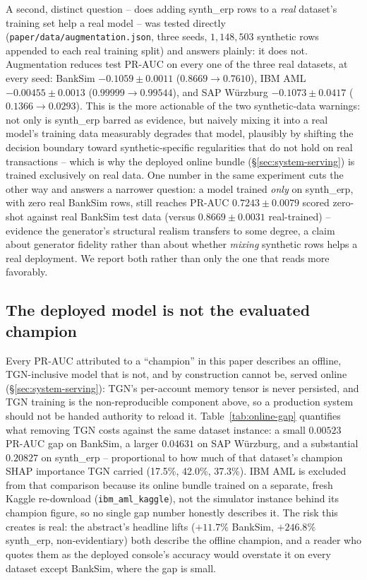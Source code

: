 A second, distinct question -- does adding synth\_erp rows to a \emph{real}
dataset's training set help a real model -- was tested directly
(\texttt{paper/data/augmentation.json}, three seeds, $1{,}148{,}503$ synthetic
rows appended to each real training split) and answers plainly: it does not.
Augmentation reduces test PR-AUC on every one of the three real datasets, at
every seed: BankSim $-0.1059\pm0.0011$ ($0.8669\to0.7610$), IBM AML
$-0.00455\pm0.0013$ ($0.99999\to0.99544$), and SAP W\"urzburg
$-0.1073\pm0.0417$ ($0.1366\to0.0293$). This is the more actionable of the
two synthetic-data warnings: not only is synth\_erp barred as evidence, but
naively mixing it into a real model's training data measurably degrades that
model, plausibly by shifting the decision boundary toward synthetic-specific
regularities that do not hold on real transactions -- which is why the
deployed online bundle (\S\ref{sec:system-serving}) is trained exclusively
on real data. One number in the same experiment cuts the other way and
answers a narrower question: a model trained \emph{only} on synth\_erp, with
zero real BankSim rows, still reaches PR-AUC $0.7243\pm0.0079$ scored
zero-shot against real BankSim test data (versus $0.8669\pm0.0031$
real-trained) -- evidence the generator's structural realism transfers to
some degree, a claim about generator fidelity rather than about whether
\emph{mixing} synthetic rows helps a real deployment. We report both rather
than only the one that reads more favorably.

\subsection{The deployed model is not the evaluated champion}
Every PR-AUC attributed to a ``champion'' in this paper describes an
offline, TGN-inclusive model that is not, and by construction cannot be,
served online (\S\ref{sec:system-serving}): TGN's per-account memory tensor
is never persisted, and TGN training is the non-reproducible component
above, so a production system should not be handed authority to reload it.
Table~\ref{tab:online-gap} quantifies what removing TGN costs against the
same dataset instance: a small $0.00523$ PR-AUC gap on BankSim, a larger
$0.04631$ on SAP W\"urzburg, and a substantial $0.20827$ on synth\_erp --
proportional to how much of that dataset's champion SHAP importance TGN
carried (17.5\%, 42.0\%, 37.3\%). IBM AML is excluded from that comparison
because its online bundle trained on a separate, fresh Kaggle re-download
(\texttt{ibm\_aml\_kaggle}), not the simulator instance behind its champion
figure, so no single gap number honestly describes it. The risk this creates
is real: the abstract's headline lifts ($+11.7\%$ BankSim, $+246.8\%$
synth\_erp, non-evidentiary) both describe the offline champion, and a
reader who quotes them as the deployed console's accuracy would overstate it
on every dataset except BankSim, where the gap is small.

